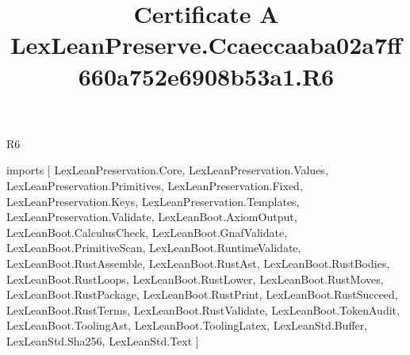 \begin{lexlean}{R6}
\title{Certificate A LexLeanPreserve.Ccaeccaaba02a7ff660a752e6908b53a1.R6}
\begin{coremodule}
imports [
  LexLeanPreservation.Core,
  LexLeanPreservation.Values,
  LexLeanPreservation.Primitives,
  LexLeanPreservation.Fixed,
  LexLeanPreservation.Keys,
  LexLeanPreservation.Templates,
  LexLeanPreservation.Validate,
  LexLeanBoot.AxiomOutput,
  LexLeanBoot.CalculusCheck,
  LexLeanBoot.GnafValidate,
  LexLeanBoot.PrimitiveScan,
  LexLeanBoot.RuntimeValidate,
  LexLeanBoot.RustAssemble,
  LexLeanBoot.RustAst,
  LexLeanBoot.RustBodies,
  LexLeanBoot.RustLoops,
  LexLeanBoot.RustLower,
  LexLeanBoot.RustMoves,
  LexLeanBoot.RustPackage,
  LexLeanBoot.RustPrint,
  LexLeanBoot.RustSucceed,
  LexLeanBoot.RustTerms,
  LexLeanBoot.RustValidate,
  LexLeanBoot.TokenAudit,
  LexLeanBoot.ToolingAst,
  LexLeanBoot.ToolingLatex,
  LexLeanStd.Buffer,
  LexLeanStd.Sha256,
  LexLeanStd.Text
]


\end{coremodule}
\end{lexlean}
